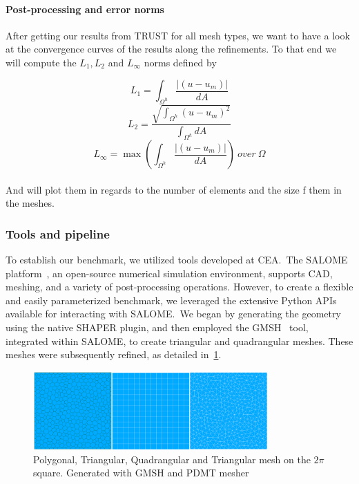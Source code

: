 \documentclass{article}
\begin{document}
\paragraph{Post-processing and error norms}

After getting our results from TRUST for all mesh types, we want to have a look at the convergence curves of the results along the refinements. To that end we will compute the $L_1, L_2$ and $L_\infty$ norms defined by

\[
L_1 = \int_{\Omega^h} \frac{|(u - u_m)|}{dA}
\]
\[
L_2 = \frac{\sqrt{\int_{\Omega^h}{(u - u_m)}^2}}{\int_{\Omega^h}dA}
\]
\[
L_{\infty} = \max{(\int_{\Omega^h} \frac{|(u - u_m)|}{dA})}~over~\Omega
\]\\
And will plot them in regards to the number of elements and the size f them in the meshes.

\subsubsection{Tools and pipeline}

To establish our benchmark, we utilized tools developed at CEA.~The SALOME platform~\cite{CEA_SALOME}, an open-source numerical simulation environment, supports CAD, meshing, and a variety of post-processing operations. However, to create a flexible and easily parameterized benchmark, we leveraged the extensive Python APIs available for interacting with SALOME.~We began by generating the geometry using the native SHAPER plugin, and then employed the GMSH~\cite{Geuzaine2009Gmsh} tool, integrated within SALOME, to create triangular and quadrangular meshes. These meshes were subsequently refined, as detailed in~\cref{refinements}.

\begin{figure}[htbp]
	\centering
	\includegraphics[width=0.8\textwidth]{./Images/refinements.png}
	\caption{\label{refinements} Polygonal, Triangular, Quadrangular and Triangular mesh on the $2\pi$ square. Generated with GMSH and PDMT mesher}
\end{figure}
\end{document}
